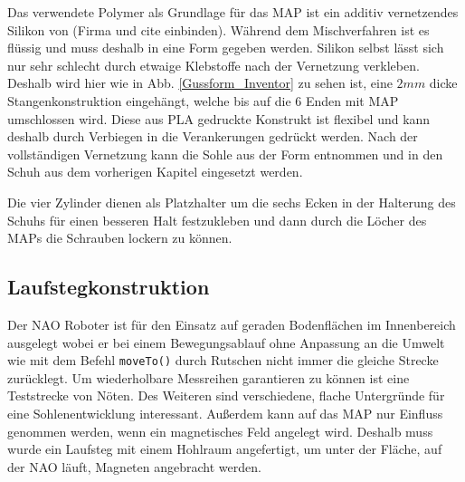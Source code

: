 Das verwendete Polymer als Grundlage für das MAP ist ein additiv vernetzendes Silikon von (Firma und cite einbinden). Während dem Mischverfahren ist es flüssig und muss deshalb in eine Form gegeben werden. Silikon selbst lässt sich nur sehr schlecht durch etwaige Klebstoffe nach der Vernetzung verkleben. Deshalb wird hier wie in Abb. \ref{Gussform_Inventor} zu sehen ist, eine $2\unit{mm}$ dicke Stangenkonstruktion eingehängt, welche bis auf die 6 Enden mit MAP umschlossen wird. Diese aus PLA gedruckte Konstrukt ist flexibel und kann deshalb durch Verbiegen in die Verankerungen gedrückt werden. Nach der vollständigen Vernetzung kann die Sohle aus der Form entnommen und in den Schuh aus dem vorherigen Kapitel eingesetzt werden. 

Die vier Zylinder dienen als Platzhalter um die sechs Ecken in der Halterung des Schuhs für einen besseren Halt festzukleben und dann durch die Löcher des MAPs die Schrauben lockern zu können. 

\subsection{Laufstegkonstruktion} \FloatBarrier
Der NAO Roboter ist für den Einsatz auf geraden Bodenflächen im Innenbereich ausgelegt wobei er bei einem Bewegungsablauf ohne Anpassung an die Umwelt wie mit dem Befehl \texttt{moveTo()} durch Rutschen nicht immer die gleiche Strecke zurücklegt. 
Um wiederholbare Messreihen garantieren zu können ist eine Teststrecke von Nöten. Des Weiteren sind verschiedene, flache Untergründe für eine Sohlenentwicklung interessant.
Außerdem kann auf das MAP nur Einfluss genommen werden, wenn ein magnetisches Feld angelegt wird. Deshalb muss wurde ein Laufsteg mit einem Hohlraum angefertigt, um unter der Fläche, auf der NAO läuft, Magneten angebracht werden. 

